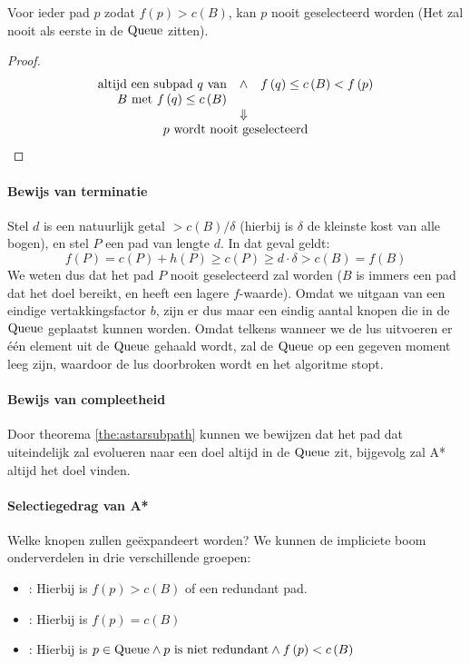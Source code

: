 \begin{corollary}
Voor ieder pad $p$ zodat $f\left(p\right)>c\left(B\right)$, kan $p$ nooit geselecteerd worden (Het zal nooit als eerste in de $\mbox{Queue}$ zitten).
\end{corollary}
\begin{proof}
\[
\begin{array}{c}
\begin{array}{rcl}
\mbox{altijd een subpad $q$ van}&\wedge&f\left(q\right)\leq c\left(B\right)<f\left(p\right)\\
\mbox{$B$ met } f\left(q\right)\leq c\left(B\right)&&\\
&\Downarrow&\\
\multicolumn{3}{c}{\mbox{$p$ wordt nooit geselecteerd}}
\end{array}
\end{array}
\]
\end{proof}
\paragraph{Bewijs van terminatie}
Stel $d$ is een natuurlijk getal $>c\left(B\right)/\delta$ (hierbij is $\delta$ de kleinste kost van alle bogen), en stel $P$ een pad van lengte $d$. In dat geval geldt:
\begin{equation}
f\left(P\right)=c\left(P\right)+h\left(P\right)\geq c\left(P\right)\geq d\cdot\delta>c\left(B\right)=f\left(B\right)
\end{equation}
We weten dus dat het pad $P$ nooit geselecteerd zal worden ($B$ is immers een pad dat het doel bereikt, en heeft een lagere $f$-waarde). Omdat we uitgaan van een eindige vertakkingsfactor $b$, zijn er dus maar een eindig aantal knopen die in de $\mbox{Queue}$ geplaatst kunnen worden. Omdat telkens wanneer we de lus uitvoeren er \'e\'en element uit de $\mbox{Queue}$ gehaald wordt, zal de $\mbox{Queue}$ op een gegeven moment leeg zijn, waardoor de lus doorbroken wordt en het algoritme stopt.
\paragraph{Bewijs van compleetheid}
Door theorema \ref{the:astarsubpath} kunnen we bewijzen dat het pad dat uiteindelijk zal evolueren naar een doel altijd in de $\mbox{Queue}$ zit, bijgevolg zal A* altijd het doel vinden.
\paragraph{Selectiegedrag van A*}
Welke knopen zullen ge\"expandeert worden? We kunnen de impliciete boom onderverdelen in drie verschillende groepen:
\begin{itemize}
 \item {}: Hierbij is $f\left(p\right)>c\left(B\right)$ of een redundant pad.
 \item {}: Hierbij is $f\left(p\right)=c\left(B\right)$
 \item {}: Hierbij is $p\in\mbox{Queue}\wedge p\mbox{ is niet redundant}\wedge f\left(p\right)<c\left(B\right)$
\end{itemize}
